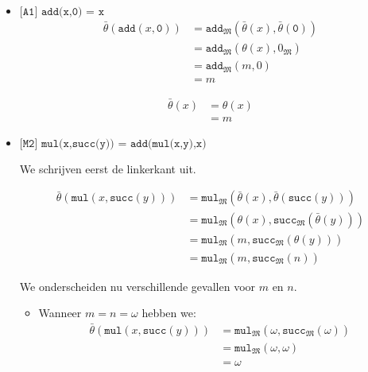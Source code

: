 \documentclass[a4paper,11pt]{article}
\begin{document}
\begin{itemize}

\item{$\texttt{[A1] add(x,0) = x}$}
\begin{align*}
\bar \theta(\texttt{add}(x,\texttt{0})) &= \texttt{add}_{\mathfrak{M}}(\bar \theta(x), \bar \theta(\texttt{0})) \\
                                        &= \texttt{add}_{\mathfrak{M}}(\theta(x), 0_{\mathfrak{M}}) \\
                                        &= \texttt{add}_{\mathfrak{M}}(m, 0) \\
                                        &= m
\end{align*}

\begin{align*}
\bar \theta(x) &= \theta(x) \\
               &= m
\end{align*}

\item{$\texttt{[M2] mul(x,succ(y)) = add(mul(x,y),x)}$}

We schrijven eerst de linkerkant uit.

\begin{align*}
\bar \theta(\texttt{mul}(x,\texttt{succ}(y))) &= \texttt{mul}_{\mathfrak{M}}(\bar \theta(x), \bar \theta(\texttt{succ}(y))) \\
                                              &= \texttt{mul}_{\mathfrak{M}}(\theta(x), \texttt{succ}_{\mathfrak{M}}(\bar \theta(y))) \\
                                              &= \texttt{mul}_{\mathfrak{M}}(m, \texttt{succ}_{\mathfrak{M}}(\theta(y))) \\
                                              &= \texttt{mul}_{\mathfrak{M}}(m, \texttt{succ}_{\mathfrak{M}}(n))
\end{align*}

We onderscheiden nu verschillende gevallen voor $m$ en $n$.

\begin{itemize}

\item
Wanneer $m = n = \omega$ hebben we:
\begin{align*}
\bar \theta(\texttt{mul}(x,\texttt{succ}(y))) &= \texttt{mul}_{\mathfrak{M}}(\omega, \texttt{succ}_{\mathfrak{M}}(\omega)) \\
                                              &= \texttt{mul}_{\mathfrak{M}}(\omega, \omega) \\
                                              &= \omega
\end{align*}


\end{itemize}
\end{itemize}
\end{document}
